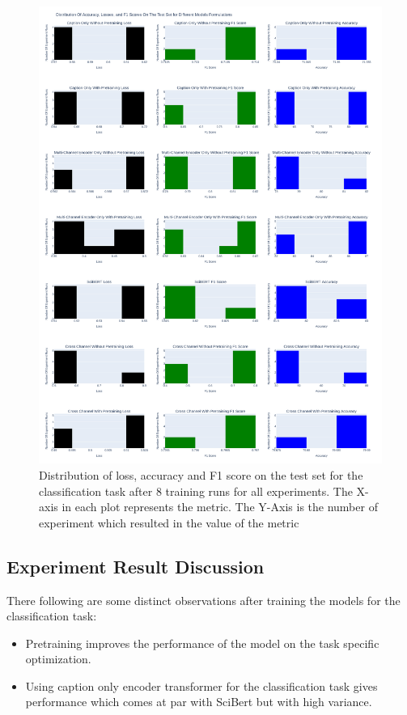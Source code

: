 \begin{figure}[p]
    \centering
    \includegraphics[width=\maxwidth{\textwidth}]{src/images/Metric-Distribution-For-Test-Set.pdf}
    \caption{Distribution of loss, accuracy and F1 score on the test set for the classification task after 8 training runs for all experiments. The X-axis in each plot represents the metric. The Y-Axis is the number of experiment which resulted in the value of the metric}
    \label{figure\arabic{figurecounter}}
\end{figure}

\subsection{Experiment Result Discussion}
\label{table_classification:experiment-result:result-discussion}
There following are some distinct observations after training the models for the classification task:
\begin{itemize}
    \item Pretraining improves the performance of the model on the task specific optimization. 
    \item Using caption only encoder transformer for the classification task gives performance which comes at par with SciBert but with high variance. 
\end{itemize}

